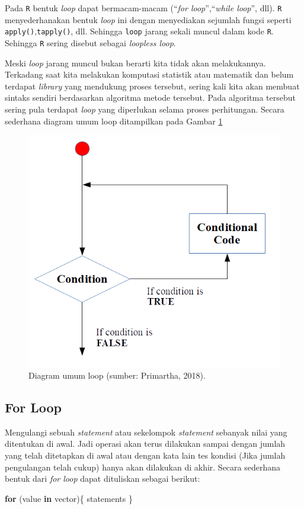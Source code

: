 \documentclass[]{book}
\newenvironment{Shaded}{\begin{snugshade}}{\end{snugshade}}
\newcommand{\ControlFlowTok}[1]{\textcolor[rgb]{0.13,0.29,0.53}{\textbf{#1}}}
\newcommand{\NormalTok}[1]{#1}
\theoremstyle{definition}
\theoremstyle{definition}
\theoremstyle{definition}
\theoremstyle{remark}
\begin{document}
Pada \texttt{R} bentuk \emph{loop} dapat bermacam-macam (``\emph{for loop}'',``\emph{while loop}'', dll). \texttt{R} menyederhanakan bentuk \emph{loop} ini dengan menyediakan sejumlah fungsi seperti \texttt{apply()},\texttt{tapply()}, dll. Sehingga \texttt{loop} jarang sekali muncul dalam kode \texttt{R}. Sehingga \texttt{R} sering disebut sebagai \emph{loopless loop}.

Meski \emph{loop} jarang muncul bukan berarti kita tidak akan melakukannya. Terkadang saat kita melakukan komputasi statistik atau matematik dan belum terdapat \emph{library} yang mendukung proses tersebut, sering kali kita akan membuat sintaks sendiri berdasarkan algoritma metode tersebut. Pada algoritma tersebut sering pula terdapat \emph{loop} yang diperlukan selama proses perhitungan. Secara sederhana diagram umum loop ditampilkan pada Gambar \ref{fig:loop}

\begin{figure}

{\centering \includegraphics[width=0.4\linewidth]{./images/skema_loop} 

}

\caption{Diagram umum loop (sumber: Primartha, 2018).}\label{fig:loop}
\end{figure}

\hypertarget{forloop}{%
\subsection{For Loop}\label{forloop}}

Mengulangi sebuah \emph{statement} atau sekelompok \emph{statement} sebanyak nilai yang ditentukan di awal. Jadi operasi akan terus dilakukan sampai dengan jumlah yang telah ditetapkan di awal atau dengan kata lain tes kondisi (Jika jumlah pengulangan telah cukup) hanya akan dilakukan di akhir. Secara sederhana bentuk dari \emph{for loop} dapat dituliskan sebagai berikut:

\begin{Shaded}
\begin{Highlighting}[]
\ControlFlowTok{for}\NormalTok{ (value }\ControlFlowTok{in}\NormalTok{ vector)\{}
\NormalTok{  statements}
\NormalTok{\}}
\end{Highlighting}
\end{Shaded}
\end{document}

